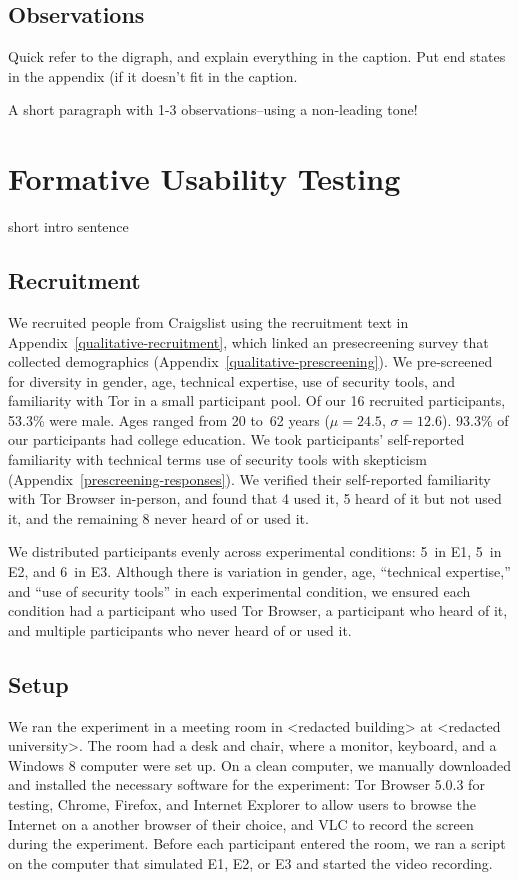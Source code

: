 \documentclass[USenglish,oneside,twocolumn]{article}
\begin{document}
\subsection{Observations}
{\color {blue}
Quick refer to the digraph, and explain everything in the caption. Put end states in the appendix (if it doesn't fit in the caption. 

A short paragraph with 1-3 observations--using a non-leading tone! 
}


\section{Formative Usability Testing}
\label{sec:qualitative}

{\color {blue}
short intro sentence
}
\subsection{Recruitment}
We recruited people from Craigslist using the recruitment text in Appendix~\ref{qualitative-recruitment}, which linked an presecreening survey that collected demographics (Appendix~\ref{qualitative-prescreening}). We pre-screened~\cite{screening} for diversity in gender, age, technical expertise, use of security tools, and familiarity with Tor in a small participant pool. Of our 16 recruited participants, 53.3\% were male. Ages ranged from 20 to~62 years ($\mu = 24.5$, $\sigma = 12.6$). 93.3\% of our participants had college education. We took participants' self-reported familiarity with technical terms use of security tools with skepticism (Appendix~\ref{prescreening-responses}). We verified their self-reported familiarity with Tor Browser in-person, and found that 4 used it, 5 heard of it but not used it, and the remaining 8 never heard of or used it.  

We distributed participants evenly across experimental conditions:  5~in E1, 5~in E2, and 6~in E3. Although there is variation in gender, age, ``technical expertise,'' and ``use of security tools'' in each experimental condition, we ensured each condition had a participant who used Tor Browser, a participant who heard of it, and multiple participants who never heard of or used it. 

\subsection{Setup} 
We ran the experiment in a meeting room in <redacted building> at <redacted university>. The room had a desk and chair, where a monitor, keyboard, and a Windows 8 computer were set up. On a clean computer, we manually downloaded and installed the necessary software for the experiment: Tor Browser 5.0.3 for testing, Chrome, Firefox, and Internet Explorer to allow users to browse the Internet on a another browser of their choice, and VLC to record the screen during the experiment. Before each participant entered the room, we ran a script on the computer that simulated E1, E2, or E3 and started the video recording.  
\end{document}
